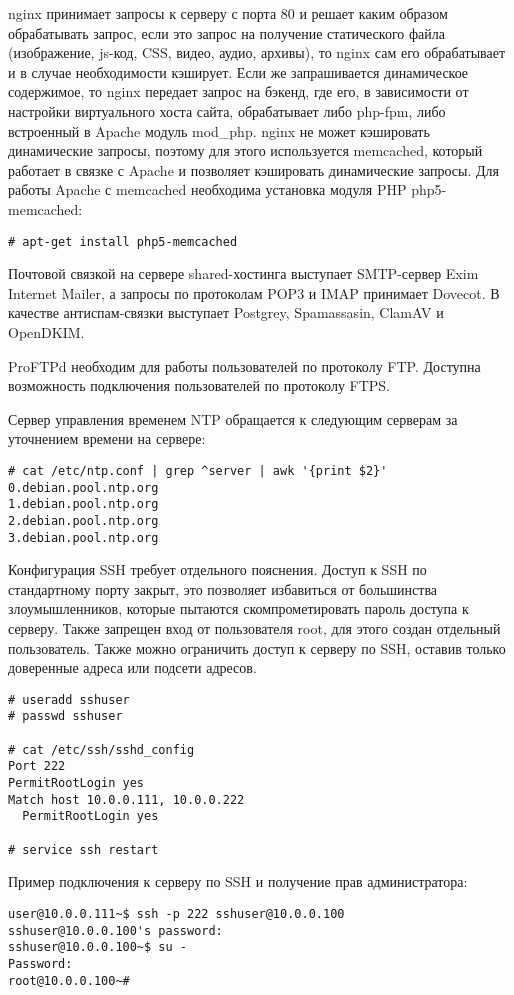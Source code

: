 nginx принимает запросы к серверу с порта 80 и решает каким образом обрабатывать запрос, если это запрос на получение статического файла (изображение, js-код, CSS, видео, аудио, архивы), то nginx сам его обрабатывает и в случае необходимости кэширует.
Если же запрашивается динамическое содержимое, то nginx передает запрос на бэкенд, где его, в зависимости от настройки виртуального хоста сайта, обрабатывает либо php-fpm, либо встроенный в Apache модуль mod\_php.
nginx не может кэшировать динамические запросы, поэтому для этого используется memcached, который работает в связке с Apache и позволяет кэшировать динамические запросы.
Для работы Apache с memcached необходима установка модуля PHP php5-memcached:
\begin{lstlisting}
# apt-get install php5-memcached
\end{lstlisting}

Почтовой связкой на сервере shared-хостинга выступает SMTP-сервер Exim Internet Mailer, а запросы по протоколам POP3 и IMAP принимает Dovecot.
В качестве антиспам-связки выступает Postgrey, Spamassasin, ClamAV и OpenDKIM.

ProFTPd необходим для работы пользователей по протоколу FTP.
Доступна возможность подключения пользователей по протоколу FTPS.

Сервер управления временем NTP обращается к следующим серверам за уточнением времени на сервере:
\begin{lstlisting}
# cat /etc/ntp.conf | grep ^server | awk '{print $2}'
0.debian.pool.ntp.org
1.debian.pool.ntp.org
2.debian.pool.ntp.org
3.debian.pool.ntp.org
\end{lstlisting}

Конфигурация SSH требует отдельного пояснения.
Доступ к SSH по стандартному порту закрыт, это позволяет избавиться от большинства злоумышленников, которые пытаются скомпрометировать пароль доступа к серверу.
Также запрещен вход от пользователя root, для этого создан отдельный пользователь.
Также можно ограничить доступ к серверу по SSH, оставив только доверенные адреса или подсети адресов.
\begin{lstlisting}
# useradd sshuser
# passwd sshuser

# cat /etc/ssh/sshd_config
Port 222
PermitRootLogin yes
Match host 10.0.0.111, 10.0.0.222
  PermitRootLogin yes

# service ssh restart
\end{lstlisting}

Пример подключения к серверу по SSH и получение прав администратора:
\begin{lstlisting}
user@10.0.0.111~$ ssh -p 222 sshuser@10.0.0.100
sshuser@10.0.0.100's password:
sshuser@10.0.0.100~$ su -
Password:
root@10.0.0.100~#
\end{lstlisting}

